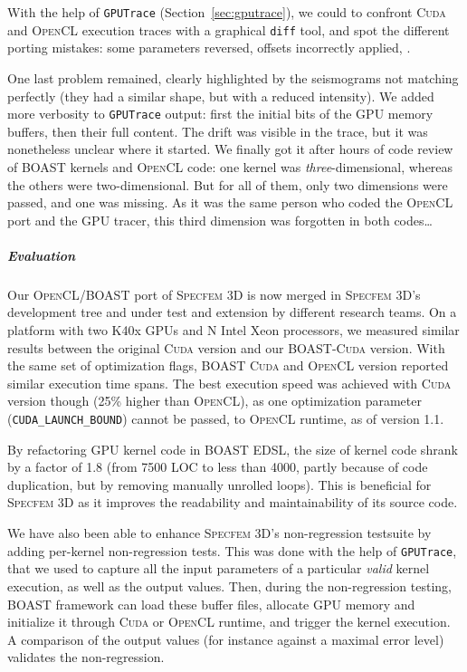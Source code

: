 \documentclass[11pt, a4paper, twoside]{montblanc}
\newcommand{\productname}[1]{\textsc{#1}}
\newcommand{\Specfem}{\productname{Specfem 3D}\xspace}
\newcommand{\Cuda}{\productname{Cuda}\xspace}
\newcommand{\OCL}{\productname{OpenCL}\xspace}
\newcommand{\code}[1]{\texttt{#1}}
\begin{document}
With the help of \code{GPUTrace} (Section~\ref{sec:gputrace}), we
could to confront \Cuda and \OCL execution traces with a graphical
\code{diff} tool, and spot the different porting mistakes: some
parameters reversed, offsets incorrectly applied, \etc{}. 

One last problem remained, clearly highlighted by the seismograms not
matching perfectly (they had a similar shape, but with a reduced
intensity). We added more verbosity to \code{GPUTrace} output: first
the initial bits of the GPU memory buffers, then their full
content. The drift was visible in the trace, but it was nonetheless
unclear where it started. We finally got it after hours of code review
of BOAST kernels and \OCL code: one kernel was
\emph{three}-dimensional, whereas the others were two-dimensional. But
for all of them, only two dimensions were passed, and one was
missing. As it was the same person who coded the \OCL port and the GPU
tracer, this third dimension was forgotten in both codes\ldots

\subparagraph{Evaluation} Our \OCL/BOAST port of \Specfem is now
merged in \Specfem's development tree and under test and extension by
different research teams. On a platform with two K40x GPUs and N Intel
Xeon processors, we measured similar results between the original
\Cuda version and our BOAST-\Cuda version. With the same set of
optimization flags, BOAST \Cuda and \OCL version reported similar
execution time spans. The best execution speed was achieved with \Cuda
version though (25\% higher than \OCL), as one optimization parameter
(\code{CUDA\_LAUNCH\_BOUND}) cannot be passed, to \OCL runtime, as of
version 1.1.

By refactoring GPU kernel code in BOAST EDSL, the size of kernel code
shrank by a factor of 1.8 (from 7500 LOC to less than 4000, partly
because of code duplication, but by removing manually unrolled
loops). This is beneficial for \Specfem as it improves the readability
and maintainability of its source code.

We have also been able to enhance \Specfem's non-regression testsuite
by adding per-kernel non-regression tests. This was done with the help
of \code{GPUTrace}, that we used to capture all the input parameters
of a particular \emph{valid} kernel execution, as well as the output
values. Then, during the non-regression testing, BOAST framework can
load these buffer files, allocate GPU memory and initialize it through
\Cuda or \OCL runtime, and trigger the kernel execution. A comparison
of the output values (for instance against a maximal error level)
validates the non-regression.
\end{document}
